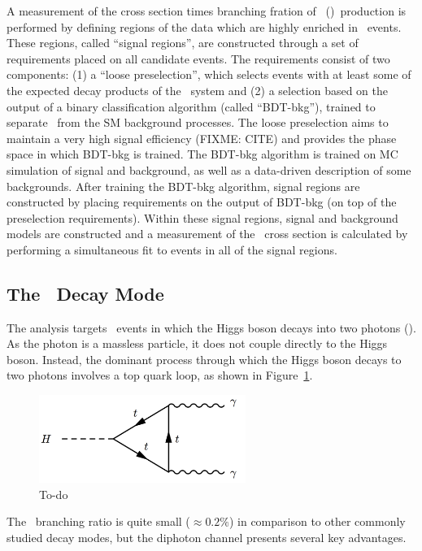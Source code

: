 A measurement of the cross section times branching fration of \ttH~(\Hgg)~production is performed by defining regions of the data which are highly enriched in \ttH~events. These regions, called ``signal regions'', are constructed through a set of requirements placed on all candidate events. 
The requirements consist of two components: 
(1) a ``loose preselection'', which selects events with at least some of the expected decay products of the \ttH~system and 
(2) a selection based on the output of a binary classification algorithm (called ``BDT-bkg''), trained to separate \ttH~from the SM background processes. The loose preselection aims to maintain a very high signal efficiency (FIXME: CITE) and provides the phase space in which BDT-bkg is trained.
The BDT-bkg algorithm is trained on MC simulation of signal and background, as well as a data-driven description of some backgrounds. After training the BDT-bkg algorithm, signal regions are constructed by placing requirements on the output of BDT-bkg (on top of the preselection requirements).
Within these signal regions, signal and background models are constructed and a measurement of the \ttH~cross section is calculated by performing a simultaneous fit to events in all of the signal regions. 
%
\subsection{The \Hgg~Decay Mode}
The analysis targets \ttH~events in which the Higgs boson decays into two photons (\Hgg). As the photon is a massless particle, it does not couple directly to the Higgs boson.
Instead, the dominant process through which the Higgs boson decays to two photons involves a top quark loop, as shown in Figure~\ref{fig:hgg_feynman}.
\begin{figure}[h!]
    \centering
    \includegraphics[width=0.6\textwidth]{figures/feynman_diagrams/hgg}
    \caption{To-do}
    \label{fig:hgg_feynman}
\end{figure}
The \Hgg~branching ratio is quite small ($\approx 0.2\%$) in comparison to other commonly studied decay modes, but the diphoton channel presents several key advantages.

